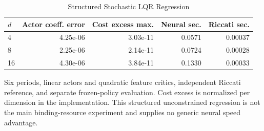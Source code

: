 \begin{table}[tbp]
\centering
\caption{Structured Stochastic LQR Regression}
\label{tab:lqr}
\small
\begin{tabular}{@{}lrrrr@{}}
\toprule
$d$ & Actor coeff. error & Cost excess max. & Neural sec. & Riccati sec. \\
\midrule
4 & 4.25e-06 & 3.03e-11 & 0.0571 & 0.00037 \\
8 & 2.25e-06 & 2.14e-11 & 0.0724 & 0.00028 \\
16 & 4.30e-06 & 3.84e-11 & 0.1330 & 0.00033 \\
\bottomrule
\end{tabular}
\par\smallskip\begin{minipage}{\linewidth}\footnotesize Six periods, linear actors and quadratic feature critics, independent Riccati reference, and separate frozen-policy evaluation. Cost excess is normalized per dimension in the implementation. This structured unconstrained regression is not the main binding-resource experiment and supplies no generic neural speed advantage.\end{minipage}
\end{table}
